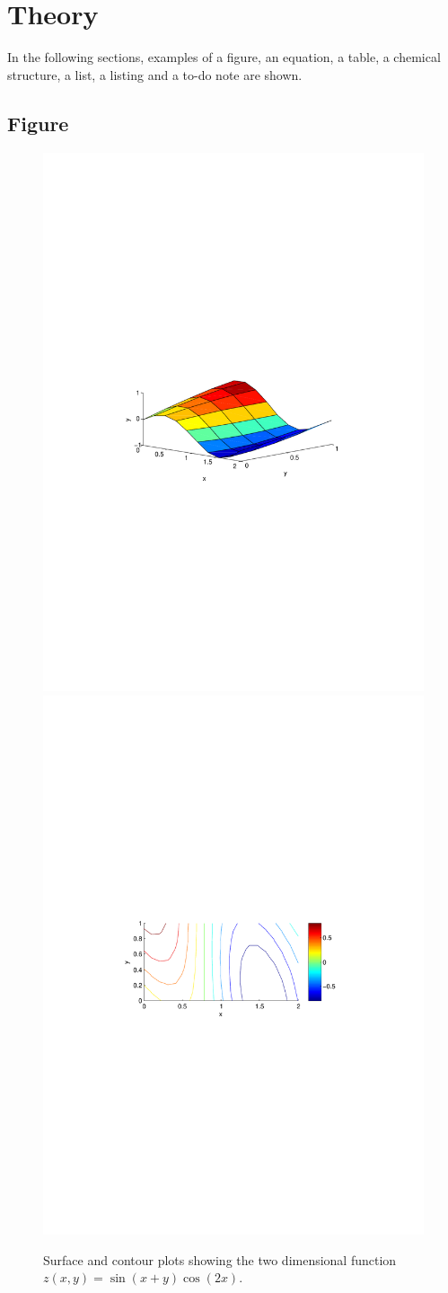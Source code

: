 \chapter{Theory}

In the following sections, examples of a figure, an equation, a table, a chemical structure, a list, a listing and a to-do note are shown.

\section{Figure}
\begin{figure}[H]
    \centering
    \includegraphics[width=0.45\linewidth, trim=3cm 11cm 3cm 11cm]{chapters/theory/X.pdf}
    \includegraphics[width=0.45\linewidth, trim=3cm 11cm 3cm 11cm]{chapters/theory/Y.pdf}
    \caption{Surface and contour plots showing the two dimensional function $z(x,y)=\sin(x+y)\cos(2x)$.}
\end{figure}

